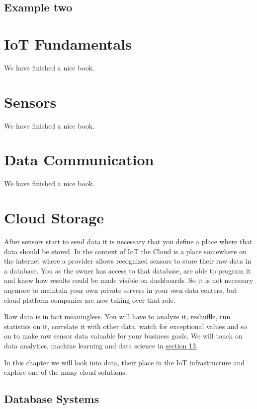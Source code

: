 \documentclass[]{book}
\theoremstyle{definition}
\theoremstyle{definition}
\theoremstyle{remark}
\begin{document}
\section{Example two}\label{example-two}

\chapter{IoT Fundamentals}\label{fundamentals}

We have finished a nice book.

\chapter{Sensors}\label{sensors}

We have finished a nice book.

\hypertarget{communication}{\chapter{Data
Communication}\label{communication}}

We have finished a nice book.

\chapter{Cloud Storage}\label{cloud}

After sensors start to send data it is necessary that you define a place
where that data should be stored. In the context of IoT the Cloud is a
place somewhere on the internet where a provider allows recognized
sensors to store their raw data in a database. You as the owner has
access to that database, are able to program it and know how results
could be made visible on dashboards. So it is not necessary anymore to
maintain your own private servers in your own data centers, but cloud
platform companies are now taking over that role.

Raw data is in fact meaningless. You will have to analyze it, reshuffle,
run statistics on it, correlate it with other data, watch for
exceptional values and so on to make raw sensor data valuable for your
business goals. We will touch on data analytics, machine learning and
data science in \protect\hyperlink{analytics}{section 13}.

In this chapter we will look into data, their place in the IoT
infrastructure and explore one of the many cloud solutions.

\section{Database Systems}\label{database-systems}
\end{document}
